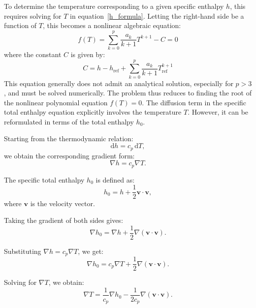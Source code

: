 \documentclass[12pt]{extarticle}
\newcommand{\<}{\langle}
\renewcommand{\>}{\rangle}
\theoremstyle{definition}
\begin{document}
To determine the temperature corresponding to a given specific enthalpy $h$, this requires solving for $T$ in equation~\ref{h_formula}. Letting the right-hand side be a function of $T$, this becomes a nonlinear algebraic equation:
\begin{equation}
    f(T) = \sum_{k=0}^{p} \frac{a_k}{k+1} T^{k+1} - C = 0
\end{equation}
where the constant $C$ is given by:
\begin{equation}
    C = h - h_{\text{ref}} + \sum_{k=0}^{p} \frac{a_k}{k+1} T_{\text{ref}}^{k+1}
\end{equation}
This equation generally does not admit an analytical solution, especially for $p > 3$, and must be solved numerically. The problem thus reduces to finding the root of the nonlinear polynomial equation $f(T) = 0$. The diffusion term in the specific total enthalpy equation explicitly involves the temperature \( T \). However, it can be reformulated in terms of the total enthalpy \( h_0 \). 

Starting from the thermodynamic relation:
\begin{equation}
    \mathrm{d}h = c_p \, \mathrm{d}T,
\end{equation}
we obtain the corresponding gradient form:
\begin{equation}
    \nabla h = c_p \nabla T.
\end{equation}

The specific total enthalpy \( h_0 \) is defined as:
\begin{equation}
    h_0 = h + \frac{1}{2} \mathbf{v} \cdot \mathbf{v},
\end{equation}
where \( \mathbf{v} \) is the velocity vector.

Taking the gradient of both sides gives:
\begin{equation}
    \nabla h_0 = \nabla h + \frac{1}{2} \nabla \left( \mathbf{v} \cdot \mathbf{v} \right).
\end{equation}

Substituting \( \nabla h = c_p \nabla T \), we get:
\begin{equation}
    \nabla h_0 = c_p \nabla T + \frac{1}{2} \nabla \left( \mathbf{v} \cdot \mathbf{v} \right).
\end{equation}

Solving for \( \nabla T \), we obtain:
\begin{equation}
    \nabla T = \frac{1}{c_p} \nabla h_0 - \frac{1}{2 c_p} \nabla \left( \mathbf{v} \cdot \mathbf{v} \right).
\end{equation}
\end{document}
